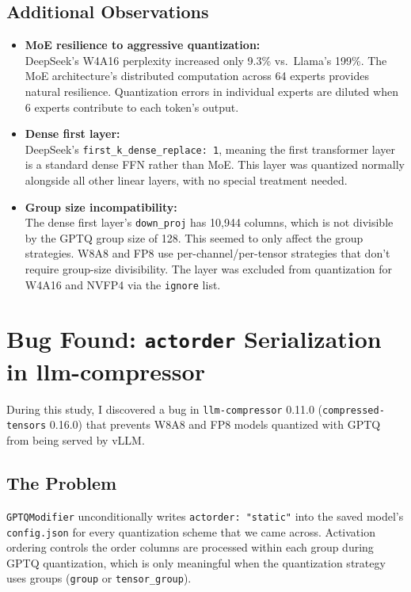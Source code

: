 \documentclass[10pt,twocolumn]{article}
\begin{document}
\subsection{Additional Observations}
\begin{itemize}
  \item \textbf{MoE resilience to aggressive quantization:}\\
  DeepSeek's W4A16 perplexity increased only 9.3\% vs.\ Llama's 199\%. The MoE architecture's distributed computation across 64 experts provides natural resilience. Quantization errors in individual experts are diluted when 6 experts contribute to each token's output.

  \item \textbf{Dense first layer:}\\
  DeepSeek's \texttt{first\_k\_dense\_replace: 1}, meaning the first transformer layer is a standard
  dense FFN rather than MoE. This layer was quantized normally alongside all other linear layers, with no special treatment needed.

  \item \textbf{Group size incompatibility:}\\
  The dense first layer's \texttt{down\_proj} has 10{,}944 columns, which is not divisible by the GPTQ group size of 128. This seemed to only affect the group strategies. W8A8 and FP8 use per-channel/per-tensor strategies that don't require group-size divisibility. The layer was excluded from quantization for W4A16 and NVFP4 via the \texttt{ignore} list.
\end{itemize}


\section{Bug Found: \texttt{actorder} Serialization in llm-compressor}

During this study, I discovered a bug in \texttt{llm-compressor} 0.11.0 (\texttt{compressed-tensors} 0.16.0) that prevents W8A8 and FP8 models quantized with GPTQ from being served by vLLM.

\subsection{The Problem}

\texttt{GPTQModifier} unconditionally writes \texttt{actorder: "static"} into the saved model's \texttt{config.json} for every quantization scheme that we came across. Activation ordering controls the order columns are processed within each group during GPTQ quantization, which is only meaningful when the quantization strategy uses groups (\texttt{group} or \texttt{tensor\_group}).
\end{document}
